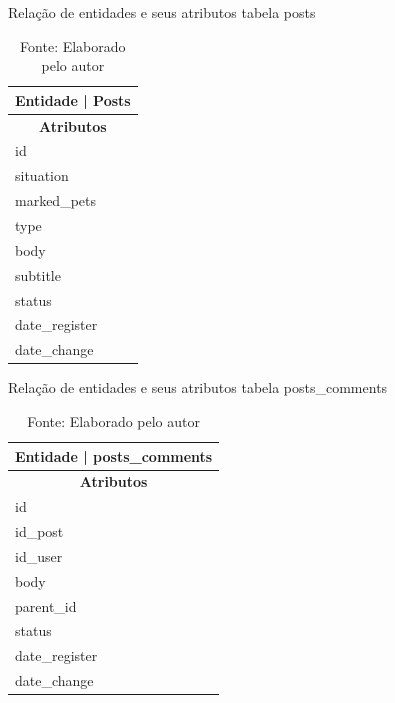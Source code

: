 \begin{table}[htb]
  \centering
  \caption{Relação de entidades e seus atributos tabela posts}
  \begin{tabular}{|p{4cm}|}
    \hline
    \multicolumn{2}{|c|}{\textbf{Entidade} | \textbf{Posts}} \\
    \hline
    \multicolumn{1}{|c|}{\textbf{Atributos}} \\
    \hline
    id \\
    \hline
    situation \\
    \hline
    marked\_pets \\
    \hline
    type \\
    \hline
    body \\
    \hline
    subtitle\\
    \hline
    status \\
    \hline
    date\_register \\
    \hline
    date\_change \\
    \hline
  \end{tabular}
  \caption*{\small Fonte: Elaborado pelo autor}
  \label{tab:Plataformas1}
\end{table}

\begin{table}[htb]
  \centering
  \caption{Relação de entidades e seus atributos tabela posts\_comments}
  \begin{tabular}{|p{4cm}|}
    \hline
    \multicolumn{2}{|c|}{\textbf{Entidade} | \textbf{posts\_comments}} \\
    \hline
    \multicolumn{1}{|c|}{\textbf{Atributos}} \\
    \hline
    id \\
    \hline
    id\_post \\
    \hline
    id\_user \\
    \hline
    body \\
    \hline
    parent\_id \\
    \hline
    status \\
    \hline
    date\_register \\
    \hline
    date\_change \\
    \hline
  \end{tabular}
  \caption*{\small Fonte: Elaborado pelo autor}
  \label{tab:Plataformas1}
\end{table}

